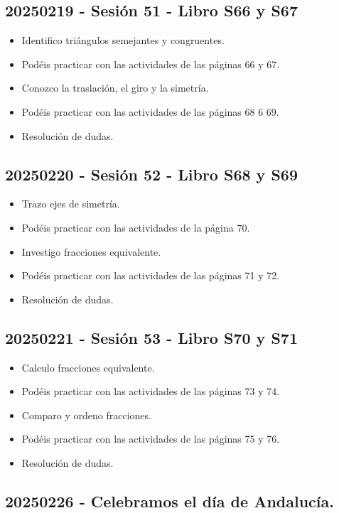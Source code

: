 \documentclass[a4paper,12pt]{article}
\begin{document}
\subsection{20250219 - Sesión 51 - Libro S66 y S67}

\begin{itemize}
    \item Identifico triángulos semejantes y congruentes.
    \item Podéis practicar con las actividades de las páginas 66 y 67.
    \item Conozco la traslación, el giro y la simetría.
    \item Podéis practicar con las actividades de las páginas 68 6 69.
    \item Resolución de dudas.
\end{itemize}

\subsection{20250220 - Sesión 52 - Libro S68 y S69}

\begin{itemize}
    \item Trazo ejes de simetría.
    \item Podéis practicar con las actividades de la página 70.
    \item Investigo fracciones equivalente.
    \item Podéis practicar con las actividades de las páginas 71 y 72.
    \item Resolución de dudas.
\end{itemize}

\subsection{20250221 - Sesión 53 - Libro S70 y S71}

\begin{itemize}
    \item Calculo fracciones equivalente.
    \item Podéis practicar con las actividades de las páginas 73 y 74.
    \item Comparo y ordeno fracciones.
    \item Podéis practicar con las actividades de las páginas 75 y 76.
    \item Resolución de dudas.
\end{itemize}

\subsection{20250226 - Celebramos el día de Andalucía.}
\end{document}
